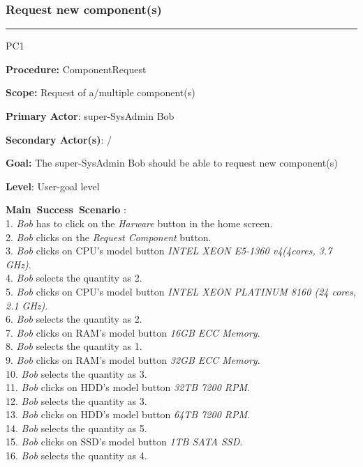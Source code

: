 \subsubsection{Request new component(s)}

\hrule
\vspace{0.5cm}
\begin{lyxlist}{PC1}
\small{
\item [\textbf{Procedure:}] ComponentRequest
\item [\textbf{Scope:}] Request of a/multiple component(s)
\item [\textbf{Primary Actor}:] super-SysAdmin Bob
\item [\textbf{Secondary Actor(s)}:] /
\item [\textbf{Goal:}] The super-SysAdmin Bob should be able to request new
component(s)
\item [\textbf{Level}:] User-goal level
\item [\textbf{Main~Success~Scenario}]:\\
1. \emph{Bob} has to click on the \emph{Harware} button in the home screen.\\
2. \emph{Bob} clicks on the \emph{Request Component} button.\\
3. \emph{Bob} clicks on CPU's model button \emph{INTEL XEON E5-1360
v4(4cores, 3.7 GHz)}.\\
4. \emph{Bob} selects the quantity as 2.\\
5. \emph{Bob} clicks on CPU's model button \emph{INTEL XEON PLATINUM 8160
(24 cores, 2.1 GHz)}.\\
6. \emph{Bob} selects the quantity as 2.\\
7. \emph{Bob} clicks on RAM's model button \emph{16GB ECC Memory}.\\
8. \emph{Bob} selects the quantity as 1.\\
9. \emph{Bob} clicks on RAM's model button \emph{32GB ECC Memory}.\\
10. \emph{Bob} selects the quantity as 3.\\
11. \emph{Bob} clicks on HDD's model button \emph{32TB 7200 RPM}.\\
12. \emph{Bob} selects the quantity as 3.\\
13. \emph{Bob} clicks on HDD's model button \emph{64TB 7200 RPM}.\\
14. \emph{Bob} selects the quantity as 5.\\
15. \emph{Bob} clicks on SSD's model button \emph{1TB SATA SSD}.\\
16. \emph{Bob} selects the quantity as 4.\\
}
\end{lyxlist}

